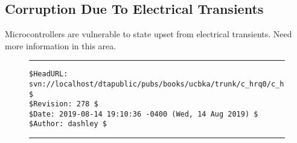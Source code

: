 
\chapter{\chrqzerolongtitle{}}

\label{chrq0}


\section{Corruption Due To Electrical Transients}

Microcontrollers are vulnerable to state upset
from electrical transients.  Need more
information in this area.



\noindent\begin{figure}[!b]
\noindent\rule[-0.25in]{\textwidth}{1pt}
\begin{tiny}
\begin{verbatim}
$HeadURL: svn://localhost/dtapublic/pubs/books/ucbka/trunk/c_hrq0/c_hrq0.tex $
$Revision: 278 $
$Date: 2019-08-14 19:10:36 -0400 (Wed, 14 Aug 2019) $
$Author: dashley $
\end{verbatim}
\end{tiny}
\noindent\rule[0.25in]{\textwidth}{1pt}
\end{figure}

%
